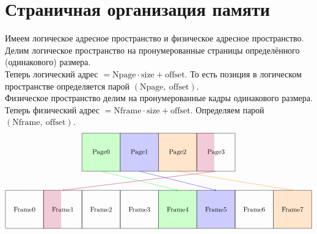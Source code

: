 \documentclass[12pt, a4paper]{article}
\begin{document}
    \section*{Страничная организация памяти}
    Имеем логическое адресное пространство и физическое адресное пространство. Делим логическое пространство на пронумерованные страницы определённого (одинакового) размера.\\
    Теперь логический адрес $ = \text{Npage}\cdot \text{size} + \text{offset}$. То есть позиция в логическом пространстве определяется парой $(\text{Npage},\ \text{offset})$.\\
    Физическое пространство делим на пронумерованные кадры одинакового размера.\\
    Теперь физический адрес $ = \text{Nframe}\cdot \text{size} + \text{offset}$. Определяем парой $(\text{Nframe},\ \text{offset})$.\\
    \[\begin{tikzpicture}
        \draw (-3, 0) node(p0)[rectangle, black, draw, minimum height = 2cm, minimum width = 2 cm, fill=green!20]{Page0};
        \draw (-1, 0) node(p1)[rectangle, black, draw, minimum height = 2cm, minimum width = 2 cm, fill=blue!20]{Page1};
        \draw (1, 0) node(p2)[rectangle, black, draw, minimum height = 2cm, minimum width = 2 cm, fill=orange!20]{Page2};
        \draw (3, 0) node(p3)[rectangle, black, draw, minimum height = 2cm, minimum width = 2 cm]{Page3};
        \filldraw[purple, opacity=0.2] (2, -1) rectangle (2.9, 1);
    

        \draw (-7, -3) node[rectangle, black, draw, minimum height = 2cm, minimum width = 2 cm]{Frame0} node[above=1cm](f0){};
        \draw (-5, -3) node(f1)[rectangle, black, draw, minimum height = 2cm, minimum width = 2 cm]{Frame1};
        \filldraw[purple, opacity=0.2] (-6, -4) rectangle (-5.1, -2);
        \draw (-3, -3) node(f2)[rectangle, black, draw, minimum height = 2cm, minimum width = 2 cm]{Frame2};
        \draw (-1, -3) node(f3)[rectangle, black, draw, minimum height = 2cm, minimum width = 2 cm]{Frame3};
        \draw (1, -3) node(f4)[rectangle, black, draw, minimum height = 2cm, minimum width = 2 cm, fill=green!20]{Frame4};
        \draw (3, -3) node(f5)[rectangle, black, draw, minimum height = 2cm, minimum width = 2 cm, fill=blue!20]{Frame5};
        \draw (5, -3) node(f6)[rectangle, black, draw, minimum height = 2cm, minimum width = 2 cm]{Frame6};
        \draw (7, -3) node(f7)[rectangle, black, draw, minimum height = 2cm, minimum width = 2 cm, fill=orange!20]{Frame7};
    
        \draw[green, ->] (-3, -1) -- (1, -2); 
        \draw[blue, ->] (-1, -1) -- (3, -2); 
        \draw[orange, ->] (1, -1) -- (7, -2); 
        \draw[purple, ->] (3, -1) -- (-5, -2); 
    \end{tikzpicture}\]
\end{document}
